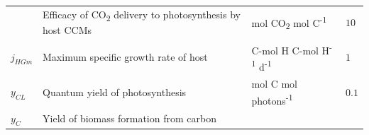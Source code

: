 \documentclass[]{elsarticle} %
\begin{document}
\begin{longtable}[c]{@{}llll@{}}
\begin{minipage}[t]{0.10\columnwidth}
\strut\end{minipage} &
\begin{minipage}[t]{0.45\columnwidth}\raggedright\strut
Efficacy of CO\textsubscript{2} delivery to photosynthesis by host CCMs
\strut\end{minipage} &
\begin{minipage}[t]{0.25\columnwidth}\raggedright\strut
mol CO\textsubscript{2} mol C\textsuperscript{-1}
\strut\end{minipage} &
\begin{minipage}[t]{0.12\columnwidth}\raggedright\strut
\(10\)
\strut\end{minipage}\tabularnewline
\begin{minipage}[t]{0.10\columnwidth}\raggedright\strut
\(j_{HGm}\)
\strut\end{minipage} &
\begin{minipage}[t]{0.45\columnwidth}\raggedright\strut
Maximum specific growth rate of host
\strut\end{minipage} &
\begin{minipage}[t]{0.25\columnwidth}\raggedright\strut
C-mol H C-mol H\textsuperscript{-1} d\textsuperscript{-1}
\strut\end{minipage} &
\begin{minipage}[t]{0.12\columnwidth}\raggedright\strut
\(1\)
\strut\end{minipage}\tabularnewline
\begin{minipage}[t]{0.10\columnwidth}\raggedright\strut
\(y_{CL}\)
\strut\end{minipage} &
\begin{minipage}[t]{0.45\columnwidth}\raggedright\strut
Quantum yield of photosynthesis
\strut\end{minipage} &
\begin{minipage}[t]{0.25\columnwidth}\raggedright\strut
mol C mol photons\textsuperscript{-1}
\strut\end{minipage} &
\begin{minipage}[t]{0.12\columnwidth}\raggedright\strut
\(0.1\)
\strut\end{minipage}\tabularnewline
\begin{minipage}[t]{0.10\columnwidth}\raggedright\strut
\(y_{C}\)
\strut\end{minipage} &
\begin{minipage}[t]{0.45\columnwidth}\raggedright\strut
Yield of biomass formation from carbon
\strut\end{minipage} &
\begin{minipage}[t]{0.25\columnwidth}\raggedright\strut

\end{minipage}
\end{longtable}
\end{document}
